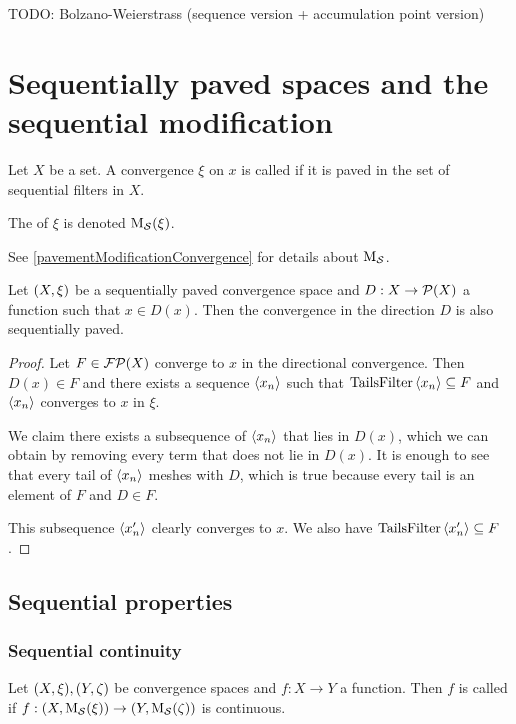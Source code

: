 TODO: Bolzano-Weierstrass (sequence version + accumulation point version)

\section{Sequentially paved spaces and the sequential modification}
\begin{definition}
Let $X$ be a set. A convergence $\xi$  on $x$ is called  if it is paved in the set of sequential filters in $X$.

The  of $\xi$ is denoted $\operatorname{M_\mathcal{S}}(\xi)$.
\end{definition}
See \ref{pavementModificationConvergence} for details about $\operatorname{M_\mathcal{S}}$.

\begin{lemma}
Let $\sSet{X, \xi}$ be a sequentially paved convergence space and $D:X\to \operatorname{\mathcal{P}}(X)$ a function such that $x\in D(x)$. Then the convergence in the direction $D$ is also sequentially paved.
\end{lemma}
\begin{proof}
Let $F\in \operatorname{\mathcal{FP}}(X)$ converge to $x$ in the directional convergence. Then $D(x)\in F$ and there exists a sequence $\left\langle x_n \right\rangle$ such that $\operatorname{TailsFilter}\left\langle x_n \right\rangle\subseteq F$ and $\left\langle x_n \right\rangle$ converges to $x$ in $\xi$.

We claim there exists a subsequence of $\left\langle x_n \right\rangle$ that lies in $D(x)$, which we can obtain by removing every term that does not lie in $D(x)$. It is enough to see that every tail of $\left\langle x_n \right\rangle$ meshes with $D$, which is true because every tail is an element of $F$ and $D\in F$.

This subsequence $\left\langle x'_n \right\rangle$ clearly converges to $x$. We also have $\operatorname{TailsFilter}\left\langle x_n' \right\rangle\subseteq F$.
\end{proof}

\subsection{Sequential properties}
\subsubsection{Sequential continuity}
\begin{definition}
Let $\sSet{X,\xi}, \sSet{Y,\zeta}$ be convergence spaces and $f:X\to Y$ a function. Then $f$ is called  if $f: \sSet{X, \seqMod(\xi)} \to \sSet{Y, \seqMod(\zeta)}$ is continuous.
\end{definition}

